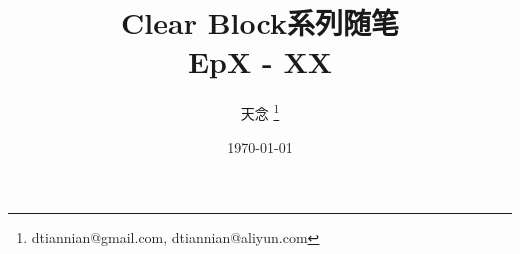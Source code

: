 \documentclass{beamer}
\title{Clear Block系列随笔 \\ EpX - XX}
\author{天念 \thanks{dtiannian@gmail.com, dtiannian@aliyun.com}}
\date{\today}
\begin{document}
\begin{frame}
    \titlepage
\end{frame}
\end{document}
